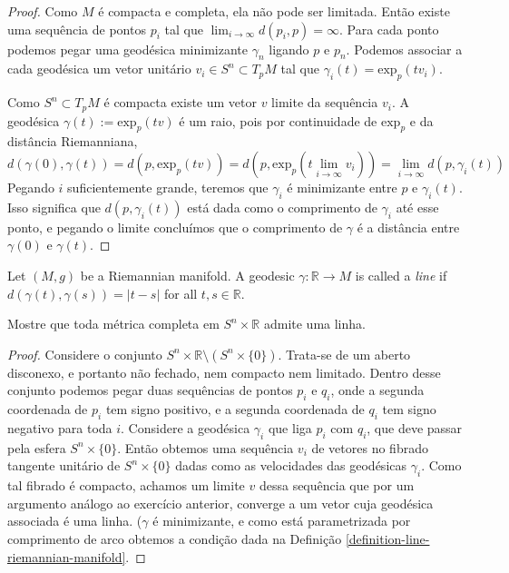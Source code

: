 \documentclass{book}
\begin{document}
\begin{proof}
Como $M$ é compacta e completa, ela não pode
ser limitada. Então
existe uma sequência de pontos $p_i$  tal que
$\lim_{i \to \infty}
d(p_i,p)=\infty$. Para cada ponto podemos
pegar uma geodésica minimizante
$\gamma_n$ ligando $p$ e $p_n$. Podemos
associar a cada geodésica um vetor
unitário $v_i \in S^n \subset T_pM$ tal que
$\gamma_i(t)=\text{exp}_p(tv_i)$.

Como $S^n \subset T_pM$ é compacta existe um
vetor $v$ limite da sequência
$v_i$. A geodésica
$\gamma(t):=\text{exp}_p(tv)$ é um raio, pois
por
continuidade de $\text{exp}_p$ e da distância
Riemanniana,
$$
d(\gamma(0),\gamma(t))=d\left(p,\text{exp}
_p(tv)\right)
=d\left(p,\text{exp}_p\left(t\lim_{i \to
\infty} v_i\right)\right)
=\lim_{i \to \infty} d(p,\gamma_i (t))
$$
Pegando $i$ suficientemente grande, teremos
que $\gamma_i$ é minimizante entre
$p$ e $\gamma_i(t)$. Isso significa que
$d(p,\gamma_i(t))$ está dada como o
comprimento de $\gamma_i$ até esse ponto, e
pegando o limite concluímos que o
comprimento de $\gamma$ é a distância entre
$\gamma(0)$ e $\gamma(t)$.
\end{proof}

\begin{definition}
\label{definition-line-riemannian-manifold}
Let $(M,g)$ be a Riemannian manifold. A
geodesic $\gamma:\mathbb{R} \to M$ is
called a {\it line} if
$d(\gamma(t),\gamma(s))=|t-s|$ for all $t,s
\in
\mathbb{R}$.
\end{definition}

\begin{exercise}
\label{exercise-l5-6}
Mostre que toda métrica completa em $S^n
\times \mathbb{R}$ admite uma linha.
\end{exercise}

\begin{proof}
Considere o conjunto $S^n\times
\mathbb{R}\setminus(S^n \times\{0\})$.
Trata-se de um aberto disconexo, e portanto
não fechado, nem compacto nem
limitado.  Dentro desse conjunto podemos
pegar duas sequências de pontos $p_i$ e
$q_i$, onde a segunda coordenada de $p_i$ tem
signo positivo, e a segunda
coordenada de $q_i$ tem  signo negativo para
toda $i$. Considere a geodésica
$\gamma_i$ que liga $p_i$ com $q_i$, que deve
passar pela esfera $S^n\times
\{0\}$. Então obtemos uma sequência $v_i$ de
vetores no fibrado tangente
unitário de $S^n\times\{0\}$ dadas como as
velocidades das geodésicas
$\gamma_i$. Como tal fibrado é compacto,
achamos um limite $v$ dessa sequência
que por um argumento análogo ao exercício
anterior, converge a um vetor cuja
geodésica associada é uma linha. ($\gamma$ é
minimizante, e como está
parametrizada por comprimento de arco obtemos
a condição dada na Definição
\ref{definition-line-riemannian-manifold}.
\end{proof}
\end{document}
